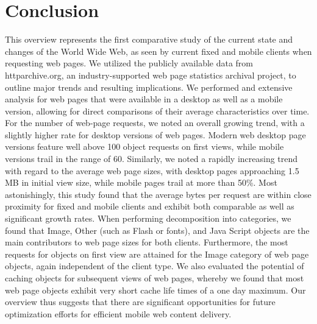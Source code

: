 \documentclass[onecolumn,12pt]{IEEEtran}
\begin{document}
\section{Conclusion}
\label{s:conc}
This overview represents the first comparative study of the current state and changes of the World Wide Web, as seen by current fixed and mobile clients when requesting web pages.
We utilized the publicly available data from httparchive.org, an industry-supported web page statistics archival project, to outline major trends and resulting implications.
We performed and extensive analysis for web pages that were available in a desktop as well as a mobile version, allowing for direct comparisons of their average characteristics over time.
For the number of web-page requests, we noted an overall growing trend, with a slightly higher rate for desktop versions of web pages. Modern web desktop page versions feature well above 100 object requests on first views, while mobile versions trail in the range of 60.
Similarly, we noted a rapidly increasing trend with regard to the average web page sizes, with desktop pages approaching 1.5 MB in initial view size, while mobile pages trail at more than 50\%.
Most astonishingly, this study found that the average bytes per request are within close proximity for fixed and mobile clients and exhibit both comparable as well as significant growth rates.
When performing decomposition into categories, we found that Image, Other (such as Flash or fonts), and Java Script objects are the main contributors to web page sizes for both clients. Furthermore, the most requests for objects on first view are attained for the Image category of web page objects, again independent of the client type.
We also evaluated the potential of caching objects for subsequent views of web pages, whereby we found that most web page objects exhibit very short cache life times of a one day maximum.
Our overview thus suggests that there are significant opportunities for future optimization efforts for efficient mobile web content delivery.



\end{document}
